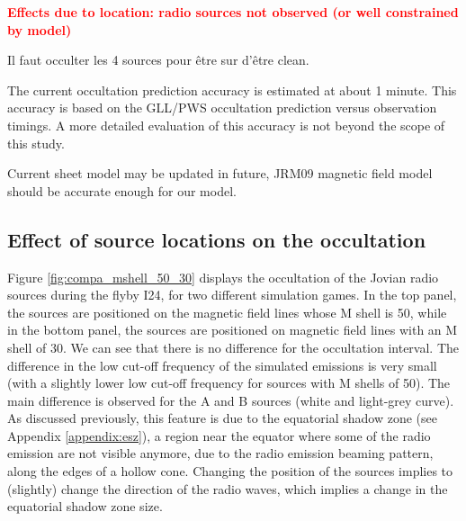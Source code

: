 \documentclass[referee]{aa}
\newcommand{\tbd}[1]{\textcolor{red}{\textbf{#1}}}
\begin{document}
\tbd{Effects due to location: radio sources not observed (or well constrained by model)}


Il faut occulter les 4 sources pour \^etre sur d'\^etre clean. 

The current occultation prediction accuracy is estimated at about 1 minute. This accuracy is based on the GLL/PWS occultation prediction versus observation timings. A more detailed evaluation of this accuracy is not beyond the scope of this study.  


Current sheet model may be updated in future, JRM09 magnetic field model should be accurate enough for our model.



\subsection{Effect of source locations on the occultation}
Figure \ref{fig:compa_mshell_50_30} displays the occultation of the Jovian radio sources during the flyby I24, for two different simulation games. In the top panel, the sources are positioned on the magnetic field lines whose M shell is 50, while in the bottom panel, the sources are positioned on magnetic field lines with an M shell of 30. We can see that there is no difference for the occultation interval. The difference in the low cut-off frequency of the simulated emissions is very small (with a slightly lower low cut-off frequency for sources with M shells of 50). The main difference is observed for the A and B sources (white and light-grey curve). As discussed previously, this feature is due to the equatorial shadow zone (see Appendix \ref{appendix:esz}), a region near the equator where some of the radio emission are not visible anymore, due to the radio emission beaming pattern, along the edges of a hollow cone. Changing the position of the sources implies to (slightly) change the direction of the radio waves, which implies a change in the equatorial shadow zone size.
\end{document}
